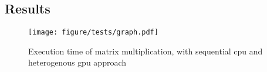 \subsection{Results} %
\label{sub:results}

\begin{figure}[h!]
    \centering
    \texttt{[image: figure/tests/graph.pdf]}
    \caption{Execution time of matrix multiplication, with sequential \gls{cpu} and heterogenous \gls{gpu} approach}\label{fig:test_results}
\end{figure}


